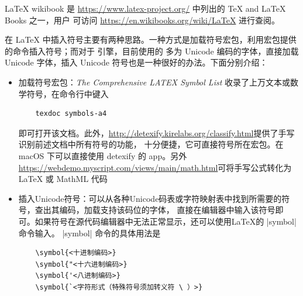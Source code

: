 
  







\LaTeX{} wikibook 是 \url{https://www.latex-project.org/} 中列出的 \TeX{} and \LaTeX{} Books 之一，用户
可访问 \url{https://en.wikibooks.org/wiki/LaTeX} 进行查阅。


%  
%  
在 \LaTeX{} 中插入符号主要有两种思路。一种方式是加载符号宏包，利用宏包提供的命令插入符号；而对于 \XeTeX{} 引擎，目前使用的
多为 Unicode 编码的字体，直接加载 Unicode 字体，插入 Unicode 符号也是一种很好的办法。下面分别介绍：
\begin{itemize}
  \item 加载符号宏包：\emph{The Comprehensive LATEX Symbol List} 收录了上万文本或数学符号，在命令行中键入
  \begin{verbatim}
    texdoc symbols-a4
  \end{verbatim}
  即可打开该文档。此外，\url{http://detexify.kirelabs.org/classify.html}提供了手写识别前述文档中所有符号的功能，
  十分便捷，它可直接符号所在宏包。在 macOS 下可以直接使用 detexify 的 app。另外
  \url{https://webdemo.myscript.com/views/main/math.html}可将手写公式转化为 \LaTeX{} 或 MathML 代码
  \item 插入Unicode符号：可以从各种Unicode码表或字符映射表中找到所需要的符号，查出其编码，加载支持该码位的字体，
  直接在编辑器中输入该符号即可。如果符号在源代码编辑器中无法正常显示，还可以使用\LaTeX{}的 |symbol| 命令输入。
  |symbol| 命令的具体用法是
  \begin{verbatim}
    \symbol{<十进制编码>}
    \symbol{"<十六进制编码>}
    \symbol{'<八进制编码>}
    \symbol{`<字符形式（特殊符号须加转义符 \ ）>}
  \end{verbatim}
\end{itemize}

